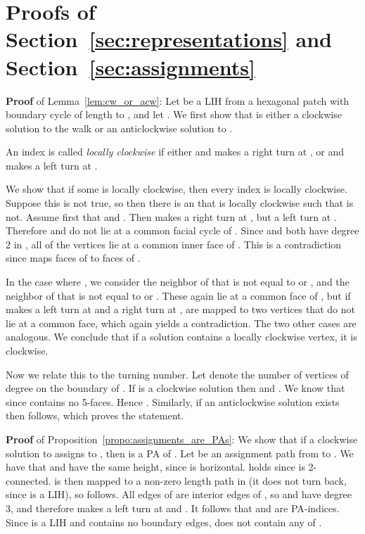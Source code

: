 \documentclass{llncs}
\newcommand{\QED}{\hspace*{\fill}{}\medskip}
\begin{document}
\newpage
\appendix

\section{Proofs of Section~\ref{sec:representations} and Section~\ref{sec:assignments}}

{\bf Proof} of Lemma~\ref{lem:cw_or_acw}:
Let  be a LIH from a hexagonal patch  with boundary cycle  of length  to , and let .
We first show that  is either a clockwise solution to the walk  or an anticlockwise solution to .

An index  is called {\em locally clockwise} if either  and  makes a right turn at , or  and  makes a left turn at .

We show that if some  is locally clockwise, then every index is locally clockwise. Suppose this is not true, so then there is an  that is locally clockwise such that  is not.
Assume first that  and . Then  makes a right turn at , but a left turn at . Therefore  and  do not lie at a common facial cycle of . Since  and  both have degree 2 in , all of the vertices  lie at a common inner face of . This is a contradiction since  maps faces of  to faces of .

In the case where , we consider the neighbor  of  that is not equal to  or , and the neighbor  of  that is not equal to  or . These again lie at a common face of , but if  makes a left turn at  and a right turn at , are mapped to two vertices that do not lie at a common face, which again yields a contradiction. The two other cases are analogous.
We conclude that if a solution contains a locally clockwise vertex, it is clockwise.

Now we relate this to the turning number.
Let  denote the number of vertices of degree  on the boundary of . If  is a clockwise solution then  and . 
We know that  since  contains no 5-faces. Hence . Similarly, if an anticlockwise solution exists then  follows, which proves the statement.\QED



{\bf Proof} of Proposition~\ref{propo:assignments_are_PAs}:
We show that if a clockwise solution  to  assigns  to , then  is a PA of .
Let  be an assignment path from  to . We have that  and  have the same height, since  is horizontal. 
 holds since  is 2-connected.  is then mapped to a non-zero length path in  (it does not turn back, since  is a LIH), so  follows.
All edges of  are interior edges of , so  and  have degree 3, and therefore  makes a left turn at  and . It follows that
 and  are PA-indices.
Since  is a LIH and  contains no boundary edges,  does not contain any of .
\QED
\end{document}
